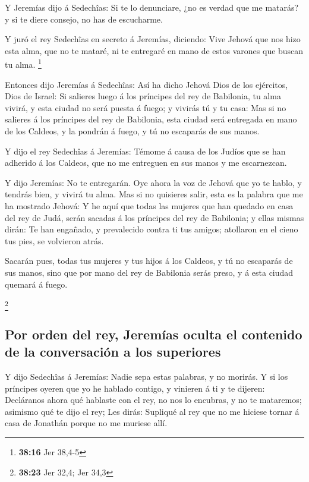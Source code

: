  Y Jeremías dijo á Sedechîas: Si te lo denunciare, ¿no es
verdad que me matarás? y si te diere consejo, no has de escucharme.

 Y juró el rey Sedechîas en secreto á Jeremías, diciendo:
Vive Jehová que nos hizo esta alma, que no te mataré, ni te entregaré en
mano de estos varones que buscan tu alma. \footnote{\textbf{38:16} Jer
  38,4-5}

 Entonces dijo Jeremías á Sedechîas: Así ha dicho Jehová
Dios de los ejércitos, Dios de Israel: Si salieres luego á los príncipes
del rey de Babilonia, tu alma vivirá, y esta ciudad no será puesta á
fuego; y vivirás tú y tu casa:  Mas si no salieres á los
príncipes del rey de Babilonia, esta ciudad será entregada en mano de
los Caldeos, y la pondrán á fuego, y tú no escaparás de sus manos.

 Y dijo el rey Sedechîas á Jeremías: Témome á causa de los
Judíos que se han adherido á los Caldeos, que no me entreguen en sus
manos y me escarnezcan.

 Y dijo Jeremías: No te entregarán. Oye ahora la voz de
Jehová que yo te hablo, y tendrás bien, y vivirá tu alma. 
Mas si no quisieres salir, esta es la palabra que me ha mostrado Jehová:
 Y he aquí que todas las mujeres que han quedado en casa
del rey de Judá, serán sacadas á los príncipes del rey de Babilonia; y
ellas mismas dirán: Te han engañado, y prevalecido contra ti tus amigos;
atollaron en el cieno tus pies, se volvieron atrás.

 Sacarán pues, todas tus mujeres y tus hijos á los Caldeos,
y tú no escaparás de sus manos, sino que por mano del rey de Babilonia
serás preso, y á esta ciudad quemará á fuego.

\footnote{\textbf{38:23} Jer 32,4; Jer 34,3}

\hypertarget{por-orden-del-rey-jeremuxedas-oculta-el-contenido-de-la-conversaciuxf3n-a-los-superiores}{%
\subsection{Por orden del rey, Jeremías oculta el contenido de la
conversación a los
superiores}\label{por-orden-del-rey-jeremuxedas-oculta-el-contenido-de-la-conversaciuxf3n-a-los-superiores}}

 Y dijo Sedechîas á Jeremías: Nadie sepa estas palabras, y
no morirás.  Y si los príncipes oyeren que yo he hablado
contigo, y vinieren á ti y te dijeren: Decláranos ahora qué hablaste con
el rey, no nos lo encubras, y no te mataremos; asimismo qué te dijo el
rey;  Les dirás: Supliqué al rey que no me hiciese tornar á
casa de Jonathán porque no me muriese allí.

